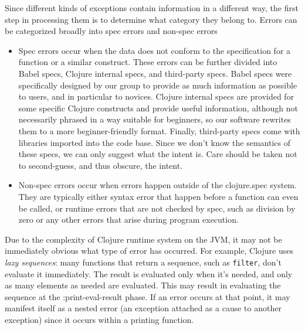 \documentclass[12pt]{article}
\begin{document}
Since different kinds of exceptions contain information in a different way, the first step in processing them is to determine what category they belong to. Errors can be categorized broadly into spec errors and non-spec errors
\begin{itemize}

	\item Spec errors occur when the data does not conform to the specification for a function or a similar construct. These errors can be further divided into Babel specs, Clojure internal specs, and third-party specs. Babel specs were specifically designed by our group to provide as much information as possible to users, and in particular to novices. 
Clojure internal specs are provided for some specific Clojure constructs and provide useful information, although not necessarily phrased in a way suitable for beginners, so our software rewrites them to a more beginner-friendly format. 
Finally, third-party specs come with libraries imported into the code base. Since we don't know the semantics of these
specs, we can only suggest what the intent is. Care should be taken not to second-guess, and thus obscure, the intent.  
	
	\item Non-spec errors occur when errors happen outside of the clojure.spec system. They are typically either syntax error that happen before a function can even be called, or runtime errors that are not checked by spec, such as division by zero or any other errors that arise during program execution.

\end{itemize}

Due to the complexity of Clojure runtime system on the JVM, it may not be immediately obvious what type of error has occurred. For example, Clojure uses \textit{lazy sequences}: many functions that return a sequence, such as \texttt{filter}, don't evaluate it immediately. The result is evaluated only when it's needed, and only as many elements as needed are evaluated. This may result in evaluating the sequence at the :print-eval-result phase. If an error occurs 
at that point, it may manifest itself as a nested error (an exception attached as a cause to another exception) since it occurs within a printing function. 
\end{document}
